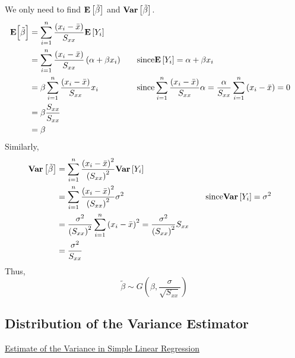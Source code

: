 We only need to find $ \bm{\mathrm{E}}\left[\tilde{\beta}\right] $ and $ \bm{\mathrm{Var}}\left[\tilde{\beta}\right] $.
\[\begin{aligned}
        \bm{\mathrm{E}}\Bigl[\tilde{\beta}\Bigr]
         & =\sum_{i=1}^{n} \frac{\left(x_{i}-\bar{x}\right)}{S_{x x}} \bm{\mathrm{E}}\left[Y_{i}\right]                                                                                                                                                                                \\
         & =\sum_{i=1}^{n} \frac{\left(x_{i}-\bar{x}\right)}{S_{x x}}\left(\alpha+\beta x_{i}\right) & \quad & \text{since} \bm{\mathrm{E}}\left[Y_{i}\right]=\alpha+\beta x_{i}                                                                                                       \\
         & =\beta \sum_{i=1}^{n} \frac{\left(x_{i}-\bar{x}\right)}{S_{x x}} x_{i}                    &       & \text{since} \sum_{i=1}^{n} \frac{\left(x_{i}-\bar{x}\right)}{S_{x x}} \alpha=\frac{\alpha}{S_{x x}} \sum_{i=1}^{n}\left(x_{i}-\bar{x}\right)=0 \\
         & =\beta \frac{S_{x x}}{S_{x x}}                                                                                                                                                                                                                      \\
         & =\beta
    \end{aligned}
\]
Similarly,
\[\begin{aligned}
        \bm{\mathrm{Var}}\left[\tilde{\beta}\right]
         & =\sum_{i=1}^{n} \frac{\left(x_{i}-\bar{x}\right)^{2}}{\left(S_{x x}\right)^{2}} \bm{\mathrm{Var}}\left[Y_{i}\right]                                                                                                 \\
         & =\sum_{i=1}^{n} \frac{\left(x_{i}-\bar{x}\right)^{2}}{\left(S_{x x}\right)^{2}} \sigma^{2}                                                    & \quad & \text{since} \bm{\mathrm{Var}}\left[Y_{i}\right]=\sigma^{2} \\
         & =\frac{\sigma^{2}}{\left(S_{x x}\right)^{2}} \sum_{i=1}^{n}\left(x_{i}-\bar{x}\right)^{2}=\frac{\sigma^{2}}{\left(S_{x x}\right)^{2}} S_{x x}                                               \\
         & =\frac{\sigma^{2}}{S_{x x}}
    \end{aligned}\]
Thus,
\[\tilde{\beta} \sim G\left(\beta, \frac{\sigma}{\sqrt{S_{x x}}}\right)\]

\subsection{Distribution of the Variance Estimator}
\underline{Estimate of the Variance in Simple Linear Regression}

